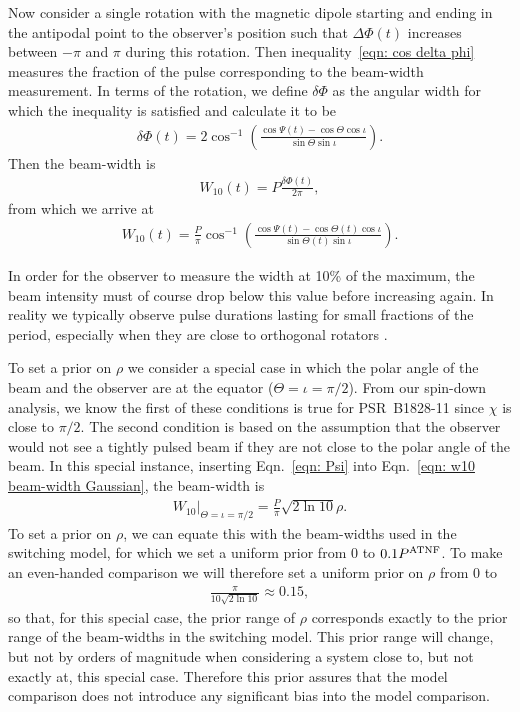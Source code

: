 \documentclass[../full_thesis/full_thesis.tex]{subfiles}
\begin{document}
Now consider a single rotation with the magnetic dipole starting and ending in
the antipodal point to the observer's position such that $\Delta\Phi(t)$ increases
between $-\pi$ and $\pi$ during this rotation. Then inequality~\eqref{eqn: cos delta phi} measures the fraction of the pulse corresponding to
the beam-width measurement. In terms of the rotation, we define $\delta\Phi$ as
the angular width for which the inequality is satisfied and calculate it to be
\begin{align}
\delta\Phi(t) = 2\cos^{-1}\left(
\frac{\cos\Psi(t)-\cos\Theta\cos\iota}
    {\sin\Theta\sin\iota}
\right).
\end{align}
Then the beam-width is
\begin{align}
W_{10}(t) = P \frac{\delta\Phi(t)}{2\pi},
\end{align}
from which we arrive at
\begin{align}
W_{10}(t) = \frac{P}{\pi} \cos^{-1}\left(
\frac{\cos \Psi(t) - \cos\Theta(t)\cos\iota}{\sin\Theta(t)\sin\iota}
\right).
\label{eqn: w10 beam-width Gaussian}
\end{align}

In order for the observer to measure the width at 10\% of the maximum, the beam
intensity must of course drop below this value before increasing again. In
reality we typically observe pulse durations lasting for small fractions of the
period, especially when they are close to orthogonal rotators \citep{Lyne1988}.

To set a prior on $\rho$ we consider a special case in which the polar angle of
the beam and the observer are at the equator ($\Theta=\iota=\pi/2$). From our
spin-down analysis, we know the first of these conditions is true for PSR~B1828-11
since $\chi$ is close to $\pi/2$. The second condition is based on the assumption
that the observer would not see a tightly pulsed beam if they are not close to the
polar angle of the beam. In this special instance, inserting
Eqn.~\eqref{eqn: Psi} into Eqn.~\eqref{eqn: w10 beam-width Gaussian}, the beam-width is
\begin{align}
W_{10} \bigg|_{\Theta=\iota=\pi/2} = \frac{P}{\pi}\sqrt{2\ln10} \rho.
\end{align}
To set a prior on $\rho$, we can equate this with the beam-widths used in the
switching model, for which we set a uniform prior from $0$ to $0.1P^{\mathrm{ATNF}}$.
To make an even-handed comparison we will therefore set a uniform prior on
$\rho$ from 0 to
\begin{align}
\frac{\pi}{10\sqrt{2\ln10}} \approx 0.15,
\label{eqn: rho prior}
\end{align}
so that, for this special case, the prior range of $\rho$ corresponds exactly
to the prior range of the beam-widths in the switching model.
This prior range will change, but not by orders of magnitude when
considering a system close to, but not exactly at, this special case. Therefore
this prior assures that the model comparison does not introduce any significant
bias into the model comparison.
\end{document}
